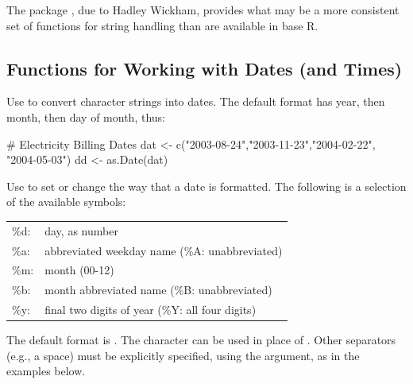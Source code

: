 The package , due to Hadley Wickham, provides what may
be a more consistent set of functions for string handling than are
available in base R.

\subsection{Functions for Working with Dates (and Times)}\label{ss:dates}


Use  to convert character strings into dates.  The
default format has year, then month, then day of month, thus:
\begin{Schunk}
\begin{Sinput}
# Electricity Billing Dates
dat <- c("2003-08-24","2003-11-23","2004-02-22",
         "2004-05-03")
dd <- as.Date(dat)
\end{Sinput}
\end{Schunk}

Use  to set or change the way that a date is
formatted.  The following is a selection of the available symbols:
\vspace*{6pt}

\begin{tabular}{ll}
\%d: & day, as number\\
\%a: & abbreviated weekday name (\%A: unabbreviated)\\
\%m: & month (00-12)\\
\%b: & month abbreviated name (\%B: unabbreviated)\\
\%y: & final two digits of year (\%Y: all four digits)\\
\end{tabular}
\vspace*{6pt}

The default format is .  The character
\code{/} can be used in place of \code{-}.  Other separators
(e.g., a space) must be explicitly specified, using the
 argument, as in the examples below.


